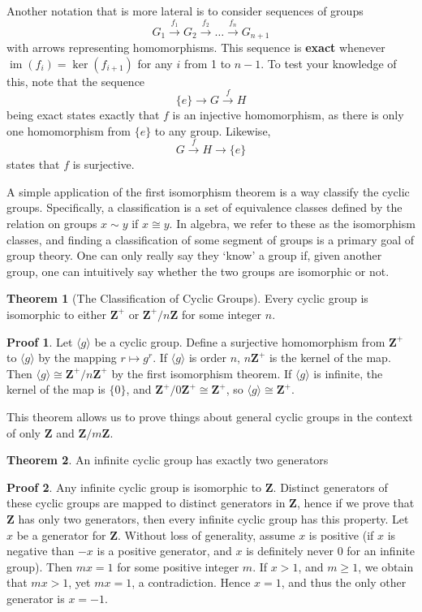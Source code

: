 \documentclass[12pt]{amsbook}
\theoremstyle{definition}
\newtheorem{theorem}{Theorem}[chapter]
\newtheorem*{prf}{Proof}
\newcommand{\im}{\operatorname{im}} %
\newcommand{\bint}{\mathbf{Z}} %
\newcommand{\gen}[1]{\langle #1 \rangle} %
\begin{document}
Another notation that is more lateral is to consider sequences of groups
%
\[ G_1 \xrightarrow{f_1} G_2 \xrightarrow{f_2} \dots \xrightarrow{f_{n}}G_{n+1} \]
%
with arrows representing homomorphisms. This sequence is {\bf exact} whenever $\im(f_i) = \ker(f_{i+1})$ for any $i$ from 1 to $n-1$. To test your knowledge of this, note that the sequence
%
\[ \{ e \} \xrightarrow{} G \xrightarrow{f} H \]
%
being exact states exactly that $f$ is an injective homomorphism, as there is only one homomorphism from $\{ e \}$ to any group. Likewise,
%
\[ G \xrightarrow{f} H \xrightarrow{} \{ e \} \]
%
states that $f$ is surjective.

A simple application of the first isomorphism theorem is a way classify the cyclic groups. Specifically, a classification  is a set of equivalence classes defined by the relation on groups $x \sim y$ if $x \cong y$. In algebra, we refer to these as the isomorphism classes, and finding a classification of some segment of groups is a primary goal of group theory. One can only really say they `know' a group if, given another group, one can intuitively say whether the two groups are isomorphic or not.

\begin{theorem}[The Classification of Cyclic Groups]
    Every cyclic group is isomorphic to either $\bint^+$ or $\bint^+/n\bint$ for some integer $n$.
\end{theorem}
\begin{prf}
Let $\gen{g}$ be a cyclic group. Define a surjective homomorphism from $\bint^+$ to $\gen{g}$ by the mapping $r \mapsto g^r$. If $\gen{g}$ is order $n$, $n\bint^+$ is the kernel of the map. Then $\gen{g} \cong \bint^+/n\bint^+$ by the first isomorphism theorem. If $\gen{g}$ is infinite, the kernel of the map is $\{ 0 \}$, and $\bint^+/0\bint^+ \cong \bint^+$, so $\gen{g} \cong \bint^+$.
\end{prf}

This theorem allows us to prove things about general cyclic groups in the context of only $\bint$ and $\bint/m\bint$.

\begin{theorem}
    An infinite cyclic group has exactly two generators
\end{theorem}
\begin{prf}
    Any infinite cyclic group is isomorphic to $\bint$. Distinct generators of these cyclic groups are mapped to distinct generators in $\bint$, hence if we prove that $\bint$ has only two generators, then every infinite cyclic group has this property. Let $x$ be a generator for $\bint$. Without loss of generality, assume $x$ is positive (if $x$ is negative than $-x$ is a positive generator, and $x$ is definitely never $0$ for an infinite group). Then $mx = 1$ for some positive integer $m$. If $x > 1$, and $m \geq 1$, we obtain that $mx > 1$, yet $mx = 1$, a contradiction. Hence $x = 1$, and thus the only other generator is $x = -1$.
\end{prf}
\end{document}
